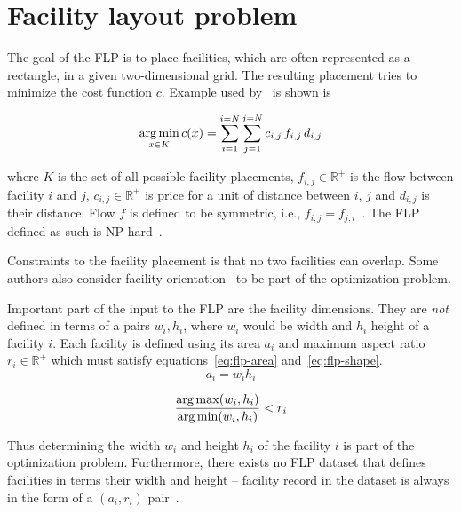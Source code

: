 \section{Facility layout problem}\label{sec:facility-layout-problem}

The goal of the FLP is to place facilities, which are often represented as a rectangle,
in a given two-dimensional grid. The resulting placement tries to minimize
the cost function $c$.
Example used by~\cite{goncalvesBiasedRandomkeyGenetic2015} is shown is

\begin{equation}
    \operatorname*{arg\,min}_{x \in K} c(x) = \sum\limits_{i=1}^{i=N}\sum\limits_{j=1}^{j=N}c_{i,j}\,f_{i,j}\,d_{i,j}
    \label{eq:flp-objective}
\end{equation}

where $K$ is the set of all possible facility placements, $f_{i,j} \in \mathbb{R^+}$ is the flow between facility $i$ and $j$, $c_{i,j} \in \mathbb{R^+}$
is price for a unit of distance between $i$, $j$ and $d_{i,j}$ is their distance.
Flow $f$ is defined to be symmetric, i.e., $f_{i,j} = f_{j,i}$~\cite{goncalvesBiasedRandomkeyGenetic2015, dunkerCoevolutionaryAlgorithmFacility2003}.
The FLP defined as such is NP-hard~\cite{liuMultiobjectiveParticleSwarm2018, goncalvesBiasedRandomkeyGenetic2015, friedrichIntegratedSlicingTree2018}.

Constraints to the facility placement is that no two facilities can overlap.
Some authors also consider facility orientation~\cite{liuMultiobjectiveParticleSwarm2018, tamHierarchicalApproachFacility1991}
to be part of the optimization problem.

Important part of the input to the FLP are the facility dimensions.
They are \textit{not} defined in terms of a pairs $w_i, h_i$, where $w_i$ would be width and $h_i$ height of a facility $i$.
Each facility is defined using its area $a_i$ and maximum aspect ratio $r_i \in \mathbb{R^+}$ which must satisfy equations~\ref{eq:flp-area} and~\ref{eq:flp-shape}.
\begin{equation}
    a_i = w_i h_i
    \label{eq:flp-area}
\end{equation}

\begin{equation}
    \dfrac{\operatorname*{arg\,max}(w_i, h_i)}{\operatorname*{arg\,min}(w_i, h_i)} < r_i
    \label{eq:flp-shape}
\end{equation}

Thus determining the width $w_i$ and height $h_i$ of the facility $i$ is part of the optimization problem.
Furthermore, there exists no FLP dataset that defines facilities in terms their width and height
– facility record in the dataset is always in the form of a $(a_i, r_i)$ pair~\cite{tamHierarchicalApproachFacility1991, dunkerCoevolutionaryAlgorithmFacility2003, liuSequencepairRepresentationMIPmodelbased2007}.

